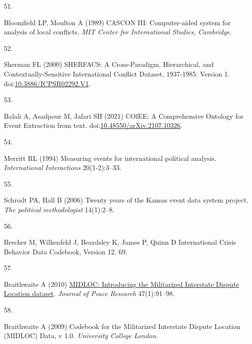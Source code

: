 \documentclass[9pt,twocolumn,twoside,lineno]{pnas-new}
\newlength{\cslhangindent}
\newlength{\csllabelwidth}
\newlength{\cslentryspacingunit} %
\newenvironment{CSLReferences}[2] %
 {%
  \setlength{\parindent}{0pt}
  \ifodd #1
  \let\oldpar\par
  \def\par{\hangindent=\cslhangindent\oldpar}
  \fi
  \setlength{\parskip}{#2\cslentryspacingunit}
 }%
 {}
\newcommand{\CSLLeftMargin}[1]{\parbox[t]{\csllabelwidth}{#1}}
\newcommand{\CSLRightInline}[1]{\parbox[t]{\linewidth - \csllabelwidth}{#1}\break}
\begin{document}
\begin{CSLReferences}{0}{0}
\leavevmode{}%
\CSLLeftMargin{51. }%
\CSLRightInline{Bloomfield LP, Moulton A (1989) {CASCON III}:
{Computer-aided} system for analysis of local conflicts. \emph{MIT
Center for International Studies, Cambridge}.}

\leavevmode{}%
\CSLLeftMargin{52. }%
\CSLRightInline{Sherman FL (2000) {SHERFACS}: {A Cross-Paradigm},
{Hierarchical}, and {Contextually-Sensitive International Conflict
Dataset}, 1937-1985: {Version} 1.
doi:\href{https://doi.org/10.3886/ICPSR02292.V1}{10.3886/ICPSR02292.V1}.}

\leavevmode{}%
\CSLLeftMargin{53. }%
\CSLRightInline{Balali A, Asadpour M, Jafari SH (2021) {COfEE}: {A
Comprehensive Ontology} for {Event Extraction} from text.
doi:\href{https://doi.org/10.48550/arXiv.2107.10326}{10.48550/arXiv.2107.10326}.}

\leavevmode{}%
\CSLLeftMargin{54. }%
\CSLRightInline{Merritt RL (1994) Measuring events for international
political analysis. \emph{International Interactions} 20(1-2):3--33.}

\leavevmode{}%
\CSLLeftMargin{55. }%
\CSLRightInline{Schrodt PA, Hall B (2006) Twenty years of the {Kansas}
event data system project. \emph{The political methodologist}
14(1):2--8.}

\leavevmode{}%
\CSLLeftMargin{56. }%
\CSLRightInline{Brecher M, Wilkenfeld J, Beardsley K, James P, Quinn D
International {Crisis Behavior Data Codebook}, {Version} 12. 69.}

\leavevmode{}%
\CSLLeftMargin{57. }%
\CSLRightInline{Braithwaite A (2010)
\href{https://doi.org/10.1177/0022343309350008}{{MIDLOC}: {Introducing}
the {Militarized Interstate Dispute Location} dataset}. \emph{Journal of
Peace Research} 47(1):91--98.}

\leavevmode{}%
\CSLLeftMargin{58. }%
\CSLRightInline{Braithwaite A (2009) Codebook for the {Militarized
Interstate Dispute Location} ({MIDLOC}) {Data}, v 1.0. \emph{University
College London}.}


\end{CSLReferences}
\end{document}
